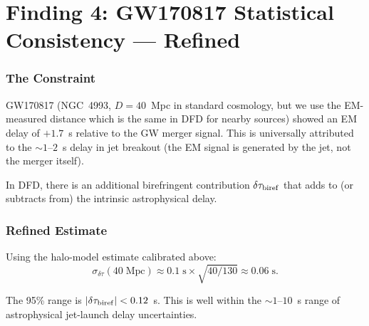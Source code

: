 \documentclass[11pt]{article}
\begin{document}
\part{Finding 4: GW170817 Statistical Consistency --- Refined}
\label{part:gw170817-refined}

\section{The Constraint}

GW170817 (NGC~4993, $D = 40$~Mpc in standard cosmology, but we use
the EM-measured distance which is the same in DFD for nearby sources)
showed an EM delay of $+1.7$~s relative to the GW merger signal. This
is universally attributed to the $\sim 1$--$2$~s delay in jet
breakout (the EM signal is generated by the jet, not the merger itself).

In DFD, there is an additional birefringent contribution
$\delta\tau_{\rm biref}$ that adds to (or subtracts from) the
intrinsic astrophysical delay.

\section{Refined Estimate}

Using the halo-model estimate calibrated above:
\begin{equation}
\sigma_{\delta\tau}(40\;\text{Mpc}) \approx 0.1\;\text{s}
\times\sqrt{40/130} \approx 0.06\;\text{s}.
\end{equation}

The 95\% range is $|\delta\tau_{\rm biref}| < 0.12$~s. This is well
within the $\sim 1$--$10$~s range of astrophysical jet-launch
delay uncertainties.
\end{document}

